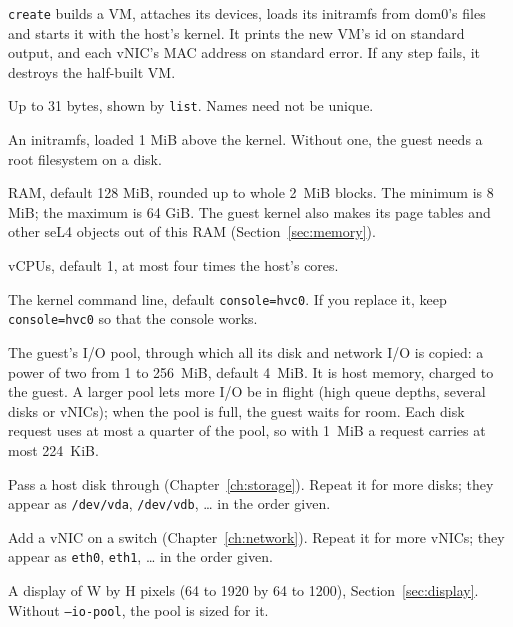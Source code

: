 \documentclass[11pt,a4paper]{report}
\newcommand{\cmd}[1]{\texttt{#1}}
\newcommand{\file}[1]{\texttt{#1}}
\begin{document}
\cmd{create} builds a VM, attaches its devices, loads its initramfs from
dom0's files and starts it with the host's kernel. It prints the new VM's id on
standard output, and each vNIC's MAC address on standard error. If any step
fails, it destroys the half-built VM.

\begin{description}[style=nextline]
  \item[\texttt{NAME}] Up to 31 bytes, shown by \cmd{list}. Names need not
    be unique.
  \item[\texttt{--initrd FILE}] An initramfs, loaded 1 MiB above the
    kernel. Without one, the guest needs a root filesystem on a disk.
  \item[\texttt{--mem MB}] RAM, default 128 MiB, rounded up to whole 2~MiB
    blocks. The minimum is 8 MiB; the maximum is 64 GiB. The guest kernel
    also makes its page tables and other seL4 objects out of this RAM
    (Section~\ref{sec:memory}).
  \item[\texttt{--vcpus N}] vCPUs, default 1, at most four times the host's
    cores.
  \item[\texttt{--cmdline STRING}] The kernel command line, default
    \texttt{console=hvc0}. If you replace it, keep \texttt{console=hvc0} so
    that the console works.

  \item[\texttt{--io-pool MB}] The guest's I/O pool, through which all its
    disk and network I/O is copied: a power of two from 1 to 256~MiB,
    default 4~MiB. It is host memory, charged to the guest. A larger pool
    lets more I/O be in flight (high queue depths, several disks or
    vNICs); when the pool is full, the guest waits for room. Each disk
    request uses at most a quarter of the pool, so with 1~MiB a request
    carries at most 224~KiB.
  \item[\texttt{--disk ...}] Pass a host disk through
    (Chapter~\ref{ch:storage}). Repeat it for more disks; they appear as
    \file{/dev/vda}, \file{/dev/vdb}, \ldots{} in the order given.
  \item[\texttt{--nic ...}] Add a vNIC on a switch
    (Chapter~\ref{ch:network}). Repeat it for more vNICs; they appear as
    \texttt{eth0}, \texttt{eth1}, \ldots{} in the order given.
  \item[\texttt{--gpu WxH}] A display of W by H pixels (64 to 1920 by 64
    to 1200), Section~\ref{sec:display}. Without \texttt{--io-pool}, the
    pool is sized for it.
\end{description}
\end{document}
